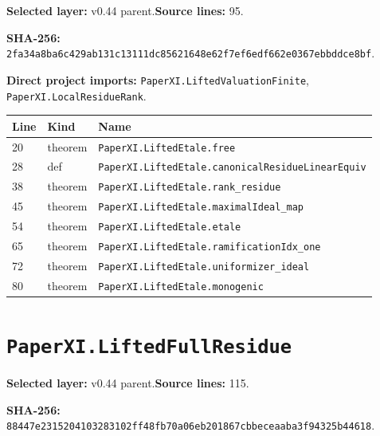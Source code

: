 \documentclass[10pt,oneside]{book}
\begin{document}
\textbf{Selected layer:} v0.44 parent.\quad\textbf{Source lines:} 95.\par\textbf{SHA-256:} {\scriptsize\nolinkurl{2fa34a8ba6c429ab131c13111dc85621648e62f7ef6edf662e0367ebbddce8bf}}.


\textbf{Direct project imports:} \nolinkurl{PaperXI.LiftedValuationFinite}, \nolinkurl{PaperXI.LocalResidueRank}.

\begin{longtable}{@{}p{}p{}p{}@{}}\toprule Line&Kind&Name\\\midrule\endhead

20&theorem&\nolinkurl{PaperXI.LiftedEtale.free}\\

28&def&\nolinkurl{PaperXI.LiftedEtale.canonicalResidueLinearEquiv}\\

38&theorem&\nolinkurl{PaperXI.LiftedEtale.rank_residue}\\

45&theorem&\nolinkurl{PaperXI.LiftedEtale.maximalIdeal_map}\\

54&theorem&\nolinkurl{PaperXI.LiftedEtale.etale}\\

65&theorem&\nolinkurl{PaperXI.LiftedEtale.ramificationIdx_one}\\

72&theorem&\nolinkurl{PaperXI.LiftedEtale.uniformizer_ideal}\\

80&theorem&\nolinkurl{PaperXI.LiftedEtale.monogenic}\\

\bottomrule\end{longtable}

\section{\texorpdfstring{\nolinkurl{PaperXI.LiftedFullResidue}}{PaperXI.LiftedFullResidue}}\label{module:PaperXI.LiftedFullResidue}

\textbf{Selected layer:} v0.44 parent.\quad\textbf{Source lines:} 115.\par\textbf{SHA-256:} {\scriptsize\nolinkurl{88447e2315204103283102ff48fb70a06eb201867cbbeceaaba3f94325b44618}}.
\end{document}
